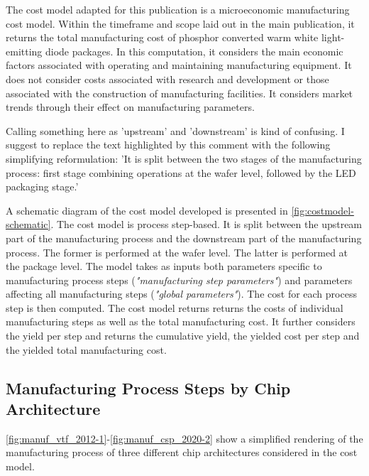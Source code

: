 \documentclass[10pt]{article}
\begin{document}
The cost model adapted for this publication is a microeconomic manufacturing cost model. Within the timeframe and scope laid out in the main publication, it returns the total manufacturing cost of phosphor converted warm white light-emitting diode packages. In this computation, it considers the main economic factors associated with operating and maintaining manufacturing equipment. It does not consider costs associated with research and development or those associated with the construction of manufacturing facilities. It considers market trends through their effect on manufacturing parameters.

Calling something here as 'upstream' and 'downstream' is kind of confusing. I suggest to replace the text highlighted by this comment with the following simplifying reformulation: 
'It is split between the two stages of the manufacturing process: first stage combining operations at the wafer level, followed by the LED packaging stage.'

A schematic diagram of the cost model developed is presented in  \cref{fig:costmodel-schematic}. The cost model is process step-based. It is split between the upstream part of the manufacturing process and the downstream part of the manufacturing process. The former is performed at the wafer level. The latter is performed at the package level. The model takes as inputs both parameters specific to manufacturing process steps (\textit{"manufacturing step parameters"}) and parameters affecting all manufacturing steps (\textit{"global parameters"}). The cost for each process step is then computed. The cost model returns returns the costs of individual manufacturing steps as well as the total manufacturing cost. It further considers the yield per step and returns the cumulative yield, the yielded cost per step and the yielded total manufacturing cost.

\subsection{Manufacturing Process Steps by Chip Architecture}

\cref{fig:manuf_vtf_2012-1}-\cref{fig:manuf_csp_2020-2} show a simplified rendering of the manufacturing process of three different chip architectures considered in the cost model.

\end{document}
